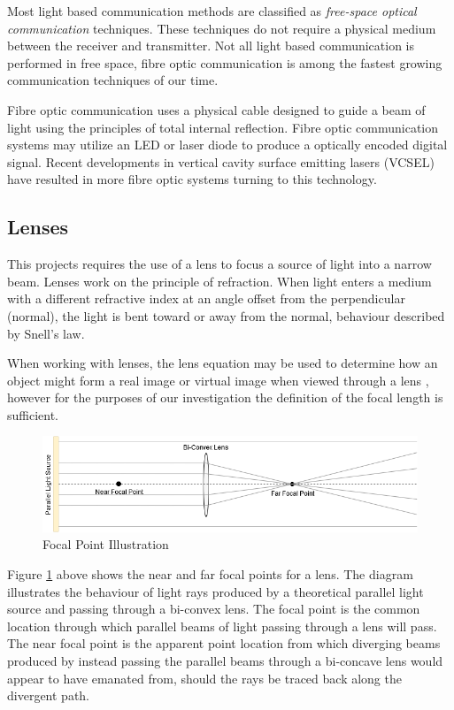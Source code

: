 Most light based communication methods are classified as \textit{free-space optical communication} techniques. These techniques do not require a physical medium between the receiver and transmitter. Not all light based communication is performed in free space, fibre optic communication is among the fastest growing communication techniques of our time.

Fibre optic communication uses a physical cable designed to guide a beam of light using the principles of total internal reflection. Fibre optic communication systems may utilize an LED or laser diode to produce a optically encoded digital signal. Recent developments in vertical cavity surface emitting lasers (VCSEL) have resulted in more fibre optic systems turning to this technology.







\subsection{Lenses}
This projects requires the use of a lens to focus a source of light into a narrow beam. Lenses work on the principle of refraction. When light enters a medium with a different refractive index at an angle offset from the perpendicular (normal), the light is bent toward or away from the normal, behaviour described by Snell's law.

When working with lenses, the lens equation may be used to determine how an object might form a real image or virtual image when viewed through a lens \cite{Knight2013}, however for the purposes of our investigation the definition of the focal length is sufficient.

\begin{figure}[H]
	\centering
	\includegraphics[width=0.8\linewidth]{figures/litreview/lens_diagram.png}
	\caption{Focal Point Illustration}
	\label{fig:lens_diagram}
\end{figure}

Figure \ref{fig:lens_diagram} above shows the near and far focal points for a lens. The diagram illustrates the behaviour of light rays produced by a theoretical parallel light source and passing through a bi-convex lens. The focal point is the common location through which parallel beams of light passing through a lens will pass. The near focal point is the apparent point location from which diverging beams produced by instead passing the parallel beams through a bi-concave lens would appear to have emanated from, should the rays be traced back along the divergent path.

